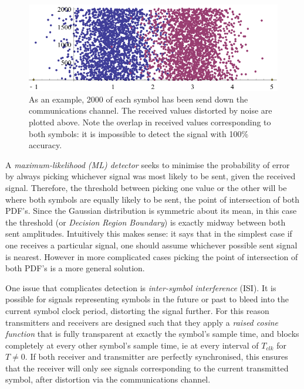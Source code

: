 \begin{figure}[htbp]
\centering
\includegraphics[width=\linewidth]{4-PAM_samples.png}
\caption{As an example, 2000 of each symbol has been send down the
communications channel. The received values distorted by noise are
plotted above. Note the overlap in received values corresponding to both
symbols: it is impossible to detect the signal with 100\% accuracy.}
\end{figure}

A \emph{maximum-likelihood (ML) detector} seeks to minimise the probability of
error by always picking whichever signal was most likely to be sent, given
the received signal. Therefore, the threshold between picking one value or the other
will be where both symbols are equally likely to be sent, the point of
intersection of both PDF's. Since the Gaussian distribution is symmetric
about its mean, in this case the threshold (or \emph{Decision Region
Boundary}) is exactly midway between both sent amplitudes. Intuitively
this makes sense: it says that in the simplest case if one receives a particular
signal, one should assume whichever possible sent signal is nearest. However in more complicated cases picking the point of intersection of both PDF's
is a more general solution. 

One issue that complicates detection is \emph{inter-symbol
interference} (ISI). It is possible for signals representing symbols in
the future or past to bleed into the current symbol clock period,
distorting the signal further. For this reason transmitters and receivers
are designed such that they apply a \emph{raised cosine function} that
is fully transparent at exactly the symbol's sample time, and blocks
completely at every other symbol's sample time, ie at every interval of
$T_{clk}$ for $T \neq 0$. If both receiver and transmitter are perfectly
synchronised, this ensures that the receiver will only see signals
corresponding to the current transmitted symbol, after distortion via
the communications channel.

